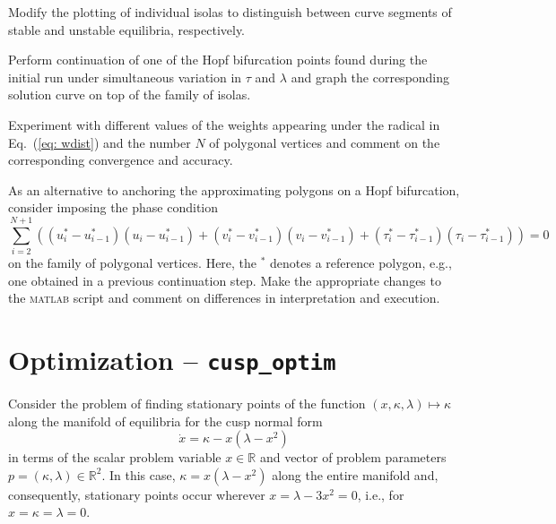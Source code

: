 \begin{exercises}

\item Modify the plotting of individual isolas to distinguish between curve segments of stable and unstable equilibria, respectively.

\item Perform continuation of one of the Hopf bifurcation points found during the initial run under simultaneous variation in $\tau$ and $\lambda$ and graph the corresponding solution curve on top of the family of isolas.

\item Experiment with different values of the weights appearing under the radical in Eq.~(\ref{eq: wdist}) and the number $N$ of polygonal vertices and comment on the corresponding convergence and accuracy.

\item As an alternative to anchoring the approximating polygons on a Hopf bifurcation, consider imposing the phase condition
\begin{equation}
\sum_{i=2}^{N+1} \left((u^*_i-u^*_{i-1})(u_i-u^*_{i-1})+(v^*_i-v^*_{i-1})(v_i-v^*_{i-1})+(\tau^*_i-\tau^*_{i-1})(\tau_i-\tau^*_{i-1})\right)=0
\end{equation}
on the family of polygonal vertices. Here, the $^\ast$ denotes a reference polygon, e.g., one obtained in a previous continuation step. Make the appropriate changes to the \textsc{matlab} script and comment on differences in interpretation and execution.

\end{exercises}

\section{Optimization -- \texttt{cusp\_optim}}
Consider the problem of finding stationary points of the function $(x,\kappa,\lambda)\mapsto\kappa$ along the manifold of equilibria for the cusp normal form
\begin{equation}
\dot{x}=\kappa-x\left(\lambda-x^2\right)
\end{equation}
in terms of the scalar problem variable $x\in\mathbb{R}$ and vector of problem parameters $p=(\kappa,\lambda)\in\mathbb{R}^2$. In this case, $\kappa=x(\lambda-x^2)$ along the entire manifold and, consequently, stationary points occur wherever $x=\lambda-3x^2=0$, i.e., for $x=\kappa=\lambda=0$.

